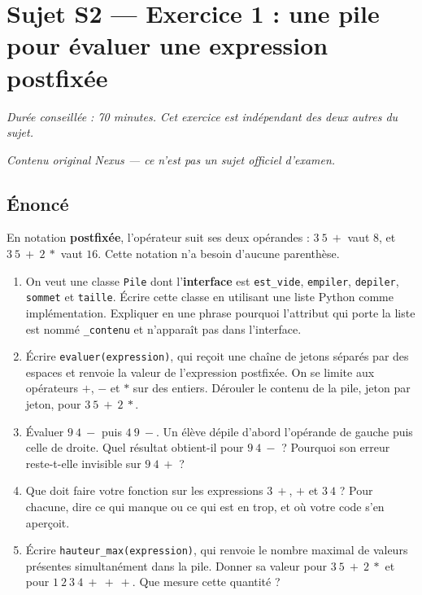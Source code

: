 \section*{Sujet S2 --- Exercice 1 : une pile pour évaluer une expression postfixée}

\textit{Durée conseillée : 70 minutes. Cet exercice est indépendant des deux
autres du sujet.}

\medskip
\textit{Contenu original Nexus --- ce n'est pas un sujet officiel d'examen.}

\subsection*{Énoncé}

En notation \textbf{postfixée}, l'opérateur suit ses deux opérandes : $3\ 5\ +$
vaut $8$, et $3\ 5\ +\ 2\ *$ vaut $16$. Cette notation n'a besoin d'aucune
parenthèse.

\begin{enumerate}
  \item On veut une classe \lstinline{Pile} dont l'\textbf{interface} est
    \lstinline{est_vide}, \lstinline{empiler}, \lstinline{depiler},
    \lstinline{sommet} et \lstinline{taille}. Écrire cette classe en utilisant
    une liste Python comme implémentation. Expliquer en une phrase pourquoi
    l'attribut qui porte la liste est nommé \lstinline{_contenu} et n'apparaît
    pas dans l'interface.

  \item Écrire \lstinline{evaluer(expression)}, qui reçoit une chaîne de jetons
    séparés par des espaces et renvoie la valeur de l'expression postfixée. On
    se limite aux opérateurs $+$, $-$ et $*$ sur des entiers. Dérouler le
    contenu de la pile, jeton par jeton, pour $3\ 5\ +\ 2\ *$.

  \item Évaluer $9\ 4\ -$ puis $4\ 9\ -$. Un élève dépile d'abord l'opérande de
    gauche puis celle de droite. Quel résultat obtient-il pour $9\ 4\ -$ ?
    Pourquoi son erreur reste-t-elle invisible sur $9\ 4\ +$ ?

  \item Que doit faire votre fonction sur les expressions $3\ +$, $+$ et
    $3\ 4$ ? Pour chacune, dire ce qui manque ou ce qui est en trop, et où
    votre code s'en aperçoit.

  \item Écrire \lstinline{hauteur_max(expression)}, qui renvoie le nombre
    maximal de valeurs présentes simultanément dans la pile. Donner sa valeur
    pour $3\ 5\ +\ 2\ *$ et pour $1\ 2\ 3\ 4\ +\ +\ +$. Que mesure cette
    quantité ?
\end{enumerate}

